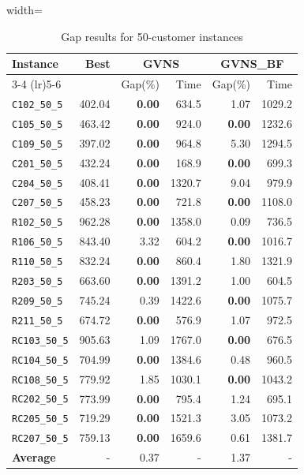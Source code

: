 \begin{table}[ht]
\centering
\small
\setlength{\tabcolsep}{5pt}
\caption{Gap results for 50-customer instances}
\vspace{4mm}
\begin{adjustbox}{width=\textwidth}
\begin{tabular}{l r r r @{\hspace{8pt}} r r @{\hspace{8pt}}}
\toprule
\multirow{2}{*}{Instance} & \multirow{2}{*}{Best} & \multicolumn{2}{c}{GVNS} & \multicolumn{2}{c}{GVNS\_BF} \\
\cmidrule(lr){3-4} \cmidrule(lr){5-6}
 &  & Gap(\%) & Time & Gap(\%) & Time \\
\midrule
\texttt{C102\_50\_5} & 402.04 & \textbf{0.00} & 634.5 & 1.07 & 1029.2 \\
\texttt{C105\_50\_5} & 463.42 & \textbf{0.00} & 924.0 & \textbf{0.00} & 1232.6 \\
\texttt{C109\_50\_5} & 397.02 & \textbf{0.00} & 964.8 & 5.30 & 1294.5 \\
\texttt{C201\_50\_5} & 432.24 & \textbf{0.00} & 168.9 & \textbf{0.00} & 699.3 \\
\texttt{C204\_50\_5} & 408.41 & \textbf{0.00} & 1320.7 & 9.04 & 979.9 \\
\texttt{C207\_50\_5} & 458.23 & \textbf{0.00} & 721.8 & \textbf{0.00} & 1108.0 \\
\texttt{R102\_50\_5} & 962.28 & \textbf{0.00} & 1358.0 & 0.09 & 736.5 \\
\texttt{R106\_50\_5} & 843.40 & 3.32 & 604.2 & \textbf{0.00} & 1016.7 \\
\texttt{R110\_50\_5} & 832.24 & \textbf{0.00} & 860.4 & 1.80 & 1321.9 \\
\texttt{R203\_50\_5} & 663.60 & \textbf{0.00} & 1391.2 & 1.00 & 604.5 \\
\texttt{R209\_50\_5} & 745.24 & 0.39 & 1422.6 & \textbf{0.00} & 1075.7 \\
\texttt{R211\_50\_5} & 674.72 & \textbf{0.00} & 576.9 & 1.07 & 972.5 \\
\texttt{RC103\_50\_5} & 905.63 & 1.09 & 1767.0 & \textbf{0.00} & 676.5 \\
\texttt{RC104\_50\_5} & 704.99 & \textbf{0.00} & 1384.6 & 0.48 & 960.5 \\
\texttt{RC108\_50\_5} & 779.92 & 1.85 & 1030.1 & \textbf{0.00} & 1043.2 \\
\texttt{RC202\_50\_5} & 773.99 & \textbf{0.00} & 795.4 & 1.24 & 695.1 \\
\texttt{RC205\_50\_5} & 719.29 & \textbf{0.00} & 1521.3 & 3.05 & 1073.2 \\
\texttt{RC207\_50\_5} & 759.13 & \textbf{0.00} & 1659.6 & 0.61 & 1381.7 \\
\midrule
\textbf{Average} & - & 0.37 & - & 1.37 & - \\
\bottomrule
\end{tabular}
\end{adjustbox}
\end{table}